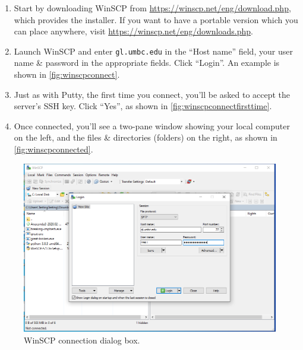 \documentclass[letter,11pt]{article}
\begin{document}
\begin{enumerate}
    \item Start by downloading WinSCP from \url{https://winscp.net/eng/download.php}, which provides the installer. If you want to have a portable version which you can place anywhere, visit \url{https://winscp.net/eng/downloads.php}.
    \item Launch WinSCP and enter \texttt{gl.umbc.edu} in the ``Host name'' field, your user name \& password in the appropriate fields. Click ``Login''. An example is shown in \autoref{fig:winscpconnect}.
    \item Just as with Putty, the first time you connect, you'll be asked to accept the server's SSH key. Click ``Yes'', as shown in \autoref{fig:winscpconnectfirsttime}.
    \item Once connected, you'll see a two-pane window showing your local computer on the left, and the files \& directories (folders) on the right, as shown in \autoref{fig:winscpconnected}.
\end{enumerate}

\begin{figure}
\centering
\includegraphics[scale=0.6]{Images/winscp_gl_connect.png}
\caption{WinSCP connection dialog box.}
\label{fig:winscpconnect}
\end{figure}
\end{document}
